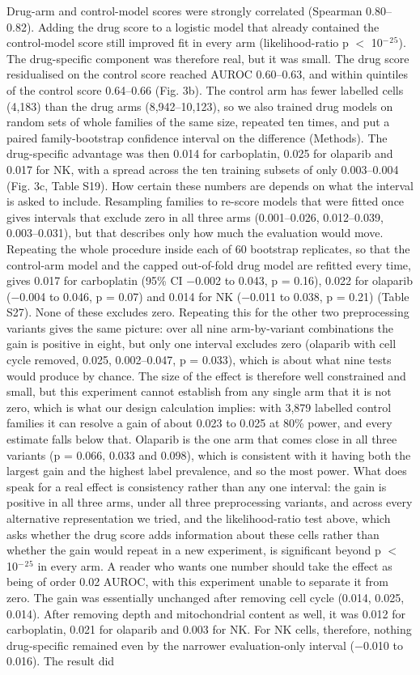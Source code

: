 \documentclass[11pt,a4paper]{article}
\begin{document}
Drug-arm and control-model scores were strongly correlated (Spearman 0.80--0.82). Adding the drug score to a logistic model that already contained the control-model score still improved fit in every arm (likelihood-ratio p $<$ 10$^-$$^2$$^5$). The drug-specific component was therefore real, but it was small. The drug score residualised on the control score reached AUROC 0.60--0.63, and within quintiles of the control score 0.64--0.66 (Fig. 3b). The control arm has fewer labelled cells (4,183) than the drug arms (8,942--10,123), so we also trained drug models on random sets of whole families of the same size, repeated ten times, and put a paired family-bootstrap confidence interval on the difference (Methods). The drug-specific advantage was then 0.014 for carboplatin, 0.025 for olaparib and 0.017 for NK, with a spread across the ten training subsets of only 0.003--0.004 (Fig. 3c, Table S19). How certain these numbers are depends on what the interval is asked to include. Resampling families to re-score models that were fitted once gives intervals that exclude zero in all three arms (0.001--0.026, 0.012--0.039, 0.003--0.031), but that describes only how much the evaluation would move. Repeating the whole procedure inside each of 60 bootstrap replicates, so that the control-arm model and the capped out-of-fold drug model are refitted every time, gives 0.017 for carboplatin (95\% CI $-$0.002 to 0.043, p = 0.16), 0.022 for olaparib ($-$0.004 to 0.046, p = 0.07) and 0.014 for NK ($-$0.011 to 0.038, p = 0.21) (Table S27). None of these excludes zero. Repeating this for the other two preprocessing variants gives the same picture: over all nine arm-by-variant combinations the gain is positive in eight, but only one interval excludes zero (olaparib with cell cycle removed, 0.025, 0.002--0.047, p = 0.033), which is about what nine tests would produce by chance. The size of the effect is therefore well constrained and small, but this experiment cannot establish from any single arm that it is not zero, which is what our design calculation implies: with 3,879 labelled control families it can resolve a gain of about 0.023 to 0.025 at 80\% power, and every estimate falls below that. Olaparib is the one arm that comes close in all three variants (p = 0.066, 0.033 and 0.098), which is consistent with it having both the largest gain and the highest label prevalence, and so the most power. What does speak for a real effect is consistency rather than any one interval: the gain is positive in all three arms, under all three preprocessing variants, and across every alternative representation we tried, and the likelihood-ratio test above, which asks whether the drug score adds information about these cells rather than whether the gain would repeat in a new experiment, is significant beyond p $<$ 10$^-$$^2$$^5$ in every arm. A reader who wants one number should take the effect as being of order 0.02 AUROC, with this experiment unable to separate it from zero. The gain was essentially unchanged after removing cell cycle (0.014, 0.025, 0.014). After removing depth and mitochondrial content as well, it was 0.012 for carboplatin, 0.021 for olaparib and 0.003 for NK. For NK cells, therefore, nothing drug-specific remained even by the narrower evaluation-only interval ($-$0.010 to 0.016). The result did 
\end{document}
